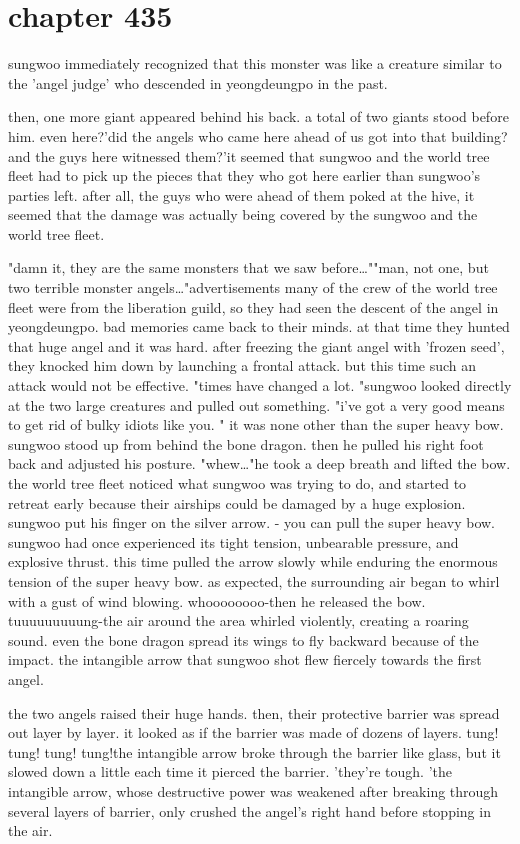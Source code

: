 \section{chapter 435}

sungwoo immediately recognized that this monster was like a creature similar to the 'angel judge' who descended in yeongdeungpo in the past.





then, one more giant appeared behind his back.
 a total of two giants stood before him.
even here?'did the angels who came here ahead of us got into that building? and the guys here witnessed them?'it seemed that sungwoo and the world tree fleet had to pick up the pieces that they who got here earlier than sungwoo's parties left.
after all, the guys who were ahead of them poked at the hive, it seemed that the damage was actually being covered by the sungwoo and the world tree fleet.

"damn it, they are the same monsters that we saw before…""man, not one, but two terrible monster angels…"advertisements    many of the crew of the world tree fleet were from the liberation guild, so they had seen the descent of the angel in yeongdeungpo.
 bad memories came back to their minds.
 at that time they hunted that huge angel and it was hard.
 after freezing the giant angel with 'frozen seed', they knocked him down by launching a frontal attack.
but this time such an attack would not be effective.
"times have changed a lot.
"sungwoo looked directly at the two large creatures and pulled out something.
"i've got a very good means to get rid of bulky idiots like you.
"
it was none other than the super heavy bow.
sungwoo stood up from behind the bone dragon.
 then he pulled his right foot back and adjusted his posture.
"whew…"he took a deep breath and lifted the bow.
 the world tree fleet noticed what sungwoo was trying to do, and started to retreat early because their airships could be damaged by a huge explosion.
sungwoo put his finger on the silver arrow.
- you can pull the super heavy bow.
sungwoo had once experienced its tight tension, unbearable pressure, and explosive thrust.
 this time pulled the arrow slowly while enduring the enormous tension of the super heavy bow.
as expected, the surrounding air began to whirl with a gust of wind blowing.
whoooooooo-then he released the bow.
tuuuuuuuuung-the air around the area whirled violently, creating a roaring sound.
 even the bone dragon spread its wings to fly backward because of the impact.
the intangible arrow that sungwoo shot flew fiercely towards the first angel.


the two angels raised their huge hands.
then, their protective barrier was spread out layer by layer.
 it looked as if the barrier was made of dozens of layers.
tung! tung! tung! tung!the intangible arrow broke through the barrier like glass, but it slowed down a little each time it pierced the barrier.
'they're tough.
'the intangible arrow, whose destructive power was weakened after breaking through several layers of barrier, only crushed the angel's right hand before stopping in the air.


 